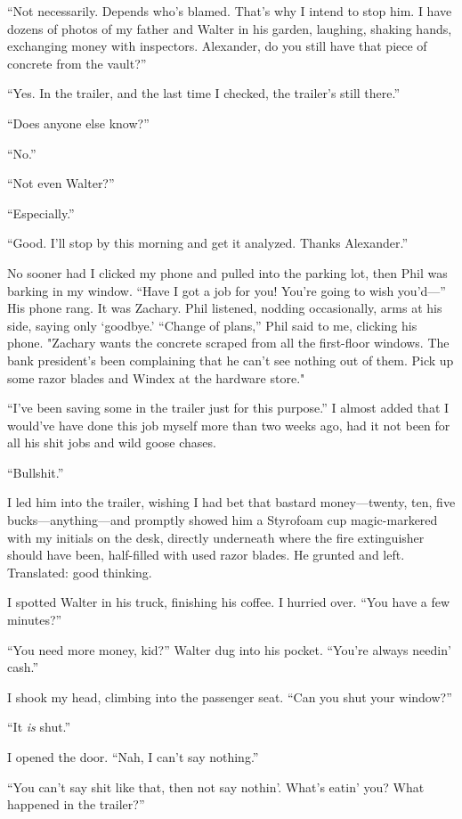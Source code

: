 ``Not necessarily. Depends who's blamed. That's why I intend to stop
him. I have dozens of photos of my father and Walter in his garden,
laughing, shaking hands, exchanging money with inspectors. Alexander, do
you still have that piece of concrete from the vault?''

``Yes. In the trailer, and the last time I checked, the trailer's still
there.''

``Does anyone else know?''

``No.''

``Not even Walter?''

``Especially.''

``Good. I'll stop by this morning and get it analyzed. Thanks
Alexander.''

No sooner had I clicked my phone and pulled into the parking lot, then
Phil was barking in my window. ``Have I got a job for you! You're going
to wish you'd---'' His phone rang. It was Zachary. Phil listened,
nodding occasionally, arms at his side, saying only `goodbye.' ``Change
of plans,'' Phil said to me, clicking his phone. "Zachary wants the
concrete scraped from all the first-floor windows. The bank president's
been complaining that he can't see nothing out of them. Pick up some
razor blades and Windex at the hardware store."

``I've been saving some in the trailer just for this purpose.'' I almost
added that I would've have done this job myself more than two weeks ago,
had it not been for all his shit jobs and wild goose chases.

``Bullshit.''

I led him into the trailer, wishing I had bet that bastard
money---twenty, ten, five bucks---anything---and promptly showed him a
Styrofoam cup magic-markered with my initials on the desk, directly
underneath where the fire extinguisher should have been, half-filled
with used razor blades. He grunted and left. Translated: good thinking.

I spotted Walter in his truck, finishing his coffee. I hurried over.
``You have a few minutes?''

``You need more money, kid?'' Walter dug into his pocket. ``You're
always needin' cash.''

I shook my head, climbing into the passenger seat. ``Can you shut your
window?''

``It \emph{is} shut.''

I opened the door. ``Nah, I can't say nothing.''

``You can't say shit like that, then not say nothin'. What's eatin' you?
What happened in the trailer?''

